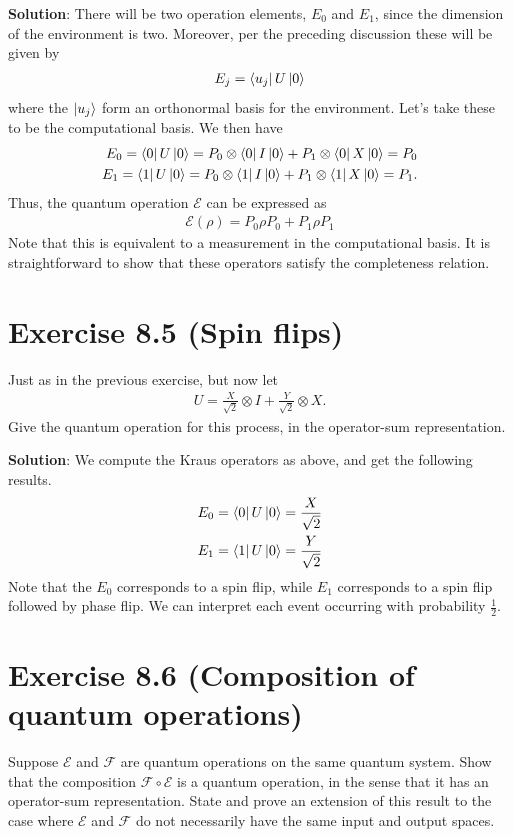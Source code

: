\documentclass{book}
\newcommand{\mc}[1]{\mathcal{#1}}
\begin{document}
    \textbf{Solution}: There will be two operation elements, $E_0$ and $E_1$, since the dimension of the environment is two. Moreover, per the preceding discussion these will be given by
    \begin{align}
        E_j = \bra{u_j}U\ket{0}
    \end{align}
    where the $\ket{u_j}$ form an orthonormal basis for the environment. Let's take these to be the computational basis. We then have
    \begin{align}
    \begin{aligned}
        E_0 = \bra{0}U\ket{0} = P_0\otimes \bra{0}I\ket{0} + P_1 \otimes \bra{0}X\ket{0} = P_0 \\
        E_1 = \bra{1}U\ket{0} = P_0\otimes \bra{1}I\ket{0} + P_1 \otimes \bra{1}X\ket{0} = P_1.
    \end{aligned}
    \end{align}
    Thus, the quantum operation $\mc{E}$ can be expressed as
    \begin{align}
        \mc{E}(\rho) = P_0 \rho P_0 + P_1 \rho P_1
    \end{align}
    Note that this is equivalent to a measurement in the computational basis. It is straightforward to show that these operators satisfy the completeness relation. 

\section*{Exercise 8.5 (Spin flips)}
    Just as in the previous exercise, but now let 
    \begin{align}
        U = \frac{X}{\sqrt{2}}\otimes I + \frac{Y}{\sqrt{2}}\otimes X.
    \end{align}
    Give the quantum operation for this process, in the operator-sum representation.
    
    \textbf{Solution}: We compute the Kraus operators as above, and get the following results.
    \begin{align}
        E_0 = \bra{0}U\ket{0} = \frac{X}{\sqrt{2}} \\
        E_1 = \bra{1}U\ket{0} = \frac{Y}{\sqrt{2}}
    \end{align}
    Note that the $E_0$ corresponds to a spin flip, while $E_1$ corresponds to a spin flip followed by phase flip. We can interpret each event occurring with probability $\frac{1}{2}$.
    
\section*{Exercise 8.6 (Composition of quantum operations)}
    Suppose $\mc{E}$ and $\mc{F}$ are quantum operations on the same quantum system. Show that the composition $\mc{F}\circ \mc{E}$ is a quantum operation, in the sense that it has an operator-sum representation. State and prove an extension of this result to the case where $\mc{E}$ and $\mc{F}$ do not necessarily have the same input and output spaces. 
    
\end{document}
